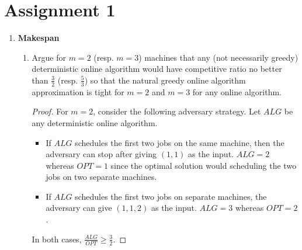 \documentclass[11pt]{article}
\begin{document}
\section*{Assignment 1}

\begin{enumerate}[leftmargin=16pt]
    \item \textbf{Makespan}
    \begin{enumerate}[leftmargin=16pt]
        \item Argue for $m=2$ (resp. $m=3$) machines that any (not necessarily greedy) deterministic online algorithm would have competitive ratio no better than $\frac{3}{2}$ (resp. $\frac{5}{3}$) so that the natural greedy online algorithm approximation is tight for $m = 2$ and $m = 3$ for any online algorithm.
        \begin{proof}
            For $m = 2$, consider the following adversary strategy. Let $ALG$ be any deterministic online algorithm.
            \begin{itemize}
                \item If $ALG$ schedules the first two jobs on the same machine, then the adversary can stop after giving $(1,1)$ as the input. $ALG = 2$ whereas $OPT = 1$ since the optimal solution would scheduling the two jobs on two separate machines.
                \item If $ALG$ schedules the first two jobs on separate machines, the adversary can give $(1,1,2)$ as the input. $ALG = 3$ whereas $OPT = 2$. 
            \end{itemize}
            In both cases, $\frac{ALG}{OPT} \geq \frac{3}{2}$.


\end{proof}
\end{enumerate}
\end{enumerate}
\end{document}
